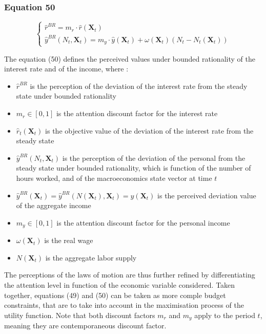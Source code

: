 \documentclass{article}
\begin{document}
\subsubsection*{Equation 50}

\begin{equation}\tag{50}
    \begin{cases}
        \hat{r}^{BR} = m_{r}\cdot\hat{r}(\textbf{X}_{t}) \\
        \hat{y}^{BR}(N_{t},\textbf{X}_{t}) = m_{y}\cdot\hat{y}(\textbf{X}_{t})+\omega(\textbf{X}_{t})(N_{t}-N_{t}(\textbf{X}_{t}))
    \end{cases}
\end{equation}

The equation (50) defines the perceived values under bounded rationality of the interest rate and of the income, where : 
\begin{itemize}
    \item $\hat{r}^{BR}$ is the perception of the deviation of the interest rate from the steady state under bounded rationality
    \item $m_{r}\in\left[0,1\right]$ is the attention discount factor for the interest rate
    \item $\hat{r}_{t}(\textbf{X}_{t})$ is the objective value of the deviation of the interest rate from the steady state 
    
    \item $\hat{y}^{BR}(N_{t},\textbf{X}_{t})$ is the perception of the deviation of the personal from the steady state under bounded rationality, which is function of the number of hours worked, and of the macroeconomics state vector at time $t$
    \item $\hat{y}^{BR}(\textbf{X}_{t})=\hat{y}^{BR}(N(\textbf{X}_{t}),\textbf{X}_{t})=\hat{y}(\textbf{X}_{t})$ is the perceived deviation value of the aggregate income
    \item $m_{y}\in\left[0,1\right]$ is the attention discount factor for the personal income
    \item $\omega(\textbf{X}_{t})$ is the real wage
    \item $N(\textbf{X}_{t})$ is the aggregate labor supply
\end{itemize}
The perceptions of the laws of motion are thus further refined by differentiating the attention level in function of the economic variable considered. 
Taken together, equations (49) and (50) can be taken as more comple budget constraints, that are to take into account in the maximisation process of the utility function.
Note that both discount factors $m_{r}$ and $m_{y}$ apply to the period $t$, meaning they are contemporaneous discount factor. 
\end{document}
